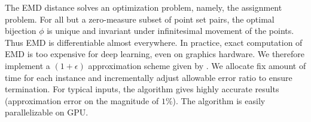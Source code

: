 The EMD distance solves an optimization problem, namely, the assignment problem. For all but a zero-measure subset of point set pairs, the optimal bijection $\phi$ is unique and invariant under infinitesimal movement of the points. Thus EMD is differentiable almost everywhere. In practice, exact computation of EMD is too expensive for deep learning, even on graphics hardware. We therefore implement a $(1+\epsilon)$ approximation scheme given by \cite{bertsekas1985distributed}. We allocate fix amount of time for each instance and incrementally adjust allowable error ratio to ensure termination. For typical inputs, the algorithm gives highly accurate results (approximation error on the magnitude of $1\%$). The algorithm is easily parallelizable on GPU.






